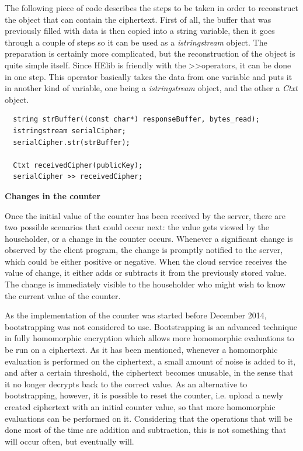 The following piece of code describes the steps to be taken in order to reconstruct the object that can contain the ciphertext. First of all, the buffer that was previously filled with data is then copied into a string variable, then it goes through a couple of steps so it can be used as a \textit{istringstream} object. The preparation is certainly more complicated, but the reconstruction of the object is quite simple itself. Since HElib is friendly with the \textgreater\textgreater operators, it can be done in one step. This operator basically takes the data from one variable and puts it in another kind of variable, one being a \textit{istringstream} object, and the other a \textit{Ctxt} object.

\begin{lstlisting}
  string strBuffer((const char*) responseBuffer, bytes_read);
  istringstream serialCipher;
  serialCipher.str(strBuffer);

  Ctxt receivedCipher(publicKey);
  serialCipher >> receivedCipher;
\end{lstlisting}


\textbf{Changes in the counter}

Once the initial value of the counter has been received by the server, there are two possible scenarios that could occur next: the value gets viewed by the householder, or a change in the counter occurs. Whenever a significant change is observed by the client program, the change is promptly notified to the server, which could be either positive or negative. When the cloud service receives the value of change, it either adds or subtracts it from the previously stored value. The change is immediately visible to the householder who might wish to know the current value of the counter.

As the implementation of the counter was started before December 2014, bootstrapping was not considered to use. Bootstrapping is an advanced technique in fully homomorphic encryption which allows more homomorphic evaluations to be run on a ciphertext. As it has been mentioned, whenever a homomorphic evaluation is performed on the ciphertext, a small amount of noise is added to it, and after a certain threshold, the ciphertext becomes unusable, in the sense that it no longer decrypts back to the correct value. As an alternative to bootstrapping, however, it is possible to reset the counter, i.e. upload a newly created ciphertext with an initial counter value, so that more homomorphic evaluations can be performed on it. Considering that the operations that will be done most of the time are addition and subtraction, this is not something that will occur often, but eventually will. 

